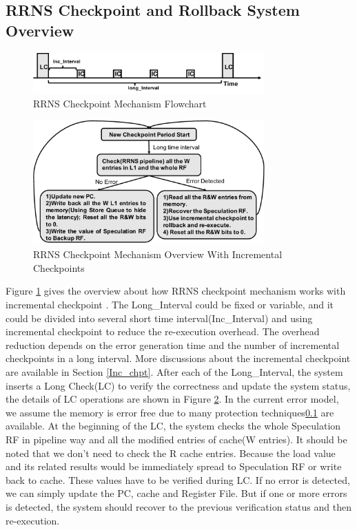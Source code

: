 \documentclass{sig-alternate}
\begin{document}
\subsection{RRNS Checkpoint and Rollback System Overview}
\begin{figure}[H]
\centering
\includegraphics[width=3.5in]{graphics/chpt_overview.pdf}

\caption{RRNS Checkpoint Mechanism Flowchart}
\label{fig_chpt_overview}
\end{figure}

\begin{figure}[H]
\centering
\includegraphics[width=3.5in]{graphics/chpt_flowchart.pdf}

\caption{RRNS Checkpoint Mechanism Overview With Incremental Checkpoints}
\label{fig_chpt_flowchart}
\end{figure}

Figure \ref{fig_chpt_overview} gives the overview about how RRNS checkpoint mechanism works with incremental checkpoint \cite{Naksinehaboon_incchpt, Agarwal_incchpt, Li_incchpt}. The Long\_Interval could be fixed or variable, and it could be divided into several short time interval(Inc\_Interval) and using incremental checkpoint to reduce the re-execution overhead. The overhead reduction depends on the error generation time and the number of incremental checkpoints in a long interval. More discussions about the incremental checkpoint are available in Section \ref{Inc_chpt}. After each of the Long\_Interval, the system inserts  a Long Check(LC) to verify the correctness and update the system status, the details of LC operations are shown in Figure \ref{fig_chpt_flowchart}. In the current error model, we assume the memory is error free due to many protection techniques\ref{} are available. At the beginning of the LC, the system checks the whole Speculation RF in pipeline way\cite{DengICRC16,DengTACO18} and all the modified entries of cache(W entries). It should be noted that we don't need to check the R cache entries. Because the load value and its related results would be immediately spread to Speculation RF or write back to cache. These values have to be verified during LC. If no error is detected, we can simply update the PC, cache and Register File. But if one or more errors is detected, the system should recover to the previous verification status and then re-execution.  
\end{document}
